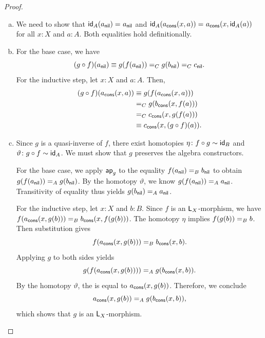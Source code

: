 \begin{proof}\ 
    \begin{enumerate}[a)]
        \item We need to show that $\mathsf{id}_A(a_{\mathsf{nil}})
        \mathrel{=_{}}a_{\mathsf{nil}}$ and $\mathsf{id}_A(a_{\mathsf{cons}}(x,a))\mathrel{=_{}}a_{\mathsf{cons}}(x,\mathsf{id}_A(a))$ for all $x\colon X$ and $a\colon A$. Both equalities hold definitionally.
        
        \item For the base case, we have
        \[
            (g\circ f)(a_{\mathsf{nil}})
                \equiv g(f(a_{\mathsf{nil}}))
                \mathrel{=_{C}}g(b_{\mathsf{nil}})
                \mathrel{=_{C}}c_{\mathsf{nil}}.
        \]
        For the inductive step, let $x\colon X$ and $a\colon A$. Then,
        \begin{align*}
            (g\circ f)(a_{\mathsf{cons}}(x,a))
                &\equiv g(f(a_{\mathsf{cons}}(x,a)))\\
                &\mathrel{=_{C}}g(b_{\mathsf{cons}}(x,f(a)))\\
                &\mathrel{=_{C}}c_{\mathsf{cons}}(x,g(f(a)))\\
                &\equiv c_{\mathsf{cons}}(x,(g\circ f)(a)).
        \end{align*}
        
        \item Since $g$ is a quasi-inverse of $f$, there exist homotopies $\eta\colon f\circ g\sim\id_B$ and $\vartheta\colon g\circ f\sim\id_A$. We must show that $g$ preserves the algebra constructors.
        
        For the base case, we apply $\mathsf{ap}_g$ to the equality $f(a_{\mathsf{nil}})\mathrel{=_{B}}b_{\mathsf{nil}}$ to obtain $g(f(a_{\mathsf{nil}}))\mathrel{=_{A}}g(b_{\mathsf{nil}})$. By the homotopy $\vartheta$, we know $g(f(a_{\mathsf{nil}}))\mathrel{=_{A}}a_{\mathsf{nil}}$. Transitivity of equality thus yields $g(b_{\mathsf{nil}})\mathrel{=_{A}}a_{\mathsf{nil}}$.
        
        For the inductive step, let $x\colon X$ and $b\colon B$. Since $f$ is an $\mathsf{L}_X$-morphism, we have $f(a_{\mathsf{cons}}(x,g(b)))\mathrel{=_{B}}b_{\mathsf{cons}}(x, f(g(b)))$. The homotopy $\eta$ implies $f(g(b))\mathrel{=_{B}}b$. Then substitution gives
        \[
            f(a_{\mathsf{cons}}(x,g(b)))
            \mathrel{=_{B}}b_{\mathsf{cons}}(x,b).
        \]
        Applying $g$ to both sides yields
        \[
            g(f(a_{\mathsf{cons}}(x,g(b))))
            \mathrel{=_{A}}g(b_{\mathsf{cons}}(x,b)).
        \]
        By the homotopy $\vartheta$, the \lhs is equal to $a_{\mathsf{cons}}(x,g(b))$. Therefore, we conclude
        \[
            a_{\mathsf{cons}}(x,g(b))
            \mathrel{=_{A}}g(b_{\mathsf{cons}}(x,b)),
        \]
        which shows that $g$ is an $\mathsf{L}_X$-morphism.\qedhere
    \end{enumerate}
\end{proof}

